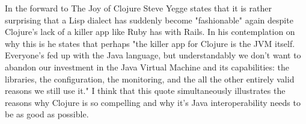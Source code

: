 \documentclass[12pt]{article}
\begin{document}
	In the forward to The Joy of Clojure\cite{joy} Steve Yegge states that it is rather surprising that a Lisp dialect has suddenly become "fashionable" again despite Clojure's lack of a killer app like Ruby has with Rails. In his contemplation on why this is he states that perhaps "the killer app for Clojure is the JVM itself. Everyone's fed up with the Java language, but understandably we don't want to abandon our investment in the Java Virtual Machine and its capabilities: the libraries, the configuration, the monitoring, and the all the other entirely valid reasons we still use it." I think that this quote simultaneously illustrates the reasons why Clojure is so compelling and why it's Java interoperability needs to be as good as possible.




%
%

%  
%
%




\end{document}
